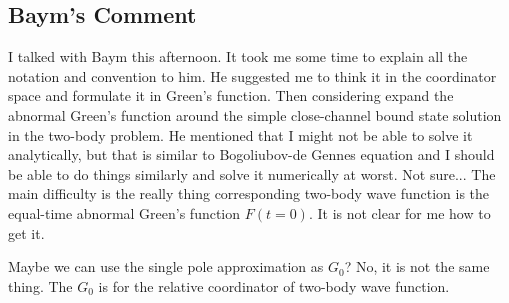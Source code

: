 \subsection{Baym's Comment}
I talked with Baym this afternoon. It took me some time to explain all the notation and convention to him.  He suggested me to think it in the coordinator space and formulate it in Green's function.  Then considering expand the abnormal Green's function around the simple close-channel bound state solution in the two-body problem.  He mentioned that I might not be able to solve it analytically, but that is similar to Bogoliubov-de Gennes equation and I should be able to do things similarly and solve it numerically at worst.  Not sure...  The main difficulty is the really thing corresponding two-body wave function is the equal-time abnormal Green's function $F(t=0)$.  It is not clear for me how to get it.  

Maybe we can use the single pole approximation as $G_0$?  No, it is not the same thing.  The $G_0$ is for the relative coordinator of two-body wave function.  

